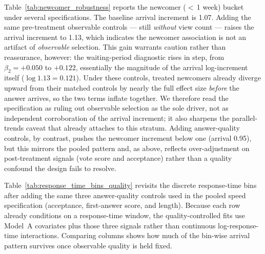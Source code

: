 

Table~\ref{tab:newcomer_robustness} reports the newcomer ($<$\,1 week) bucket under several specifications. The baseline arrival increment is 1.07. Adding the same pre-treatment observable controls --- still \emph{without} view count --- raises the arrival increment to 1.13, which indicates the newcomer association is not an artifact of \emph{observable} selection. This gain warrants caution rather than reassurance, however: the waiting-period diagnostic rises in step, from $\beta_2 = +0.050$ to $+0.122$, essentially the magnitude of the arrival log-increment itself ($\log 1.13 = 0.121$). Under these controls, treated newcomers already diverge upward from their matched controls by nearly the full effect size \emph{before} the answer arrives, so the two terms inflate together. We therefore read the specification as ruling out observable selection as the sole driver, not as independent corroboration of the arrival increment; it also sharpens the parallel-trends caveat that already attaches to this stratum. Adding answer-quality controls, by contrast, pushes the newcomer increment below one (arrival 0.95), but this mirrors the pooled pattern and, as above, reflects over-adjustment on post-treatment signals (vote score and acceptance) rather than a quality confound the design fails to resolve.



Table~\ref{tab:response_time_bins_quality} revisits the discrete response-time bins after adding the same three answer-quality controls used in the pooled speed specification (acceptance, first-answer score, and length). Because each row already conditions on a response-time window, the quality-controlled fits use Model~A covariates plus those three signals rather than continuous log-response-time interactions. Comparing columns shows how much of the bin-wise arrival pattern survives once observable quality is held fixed.


